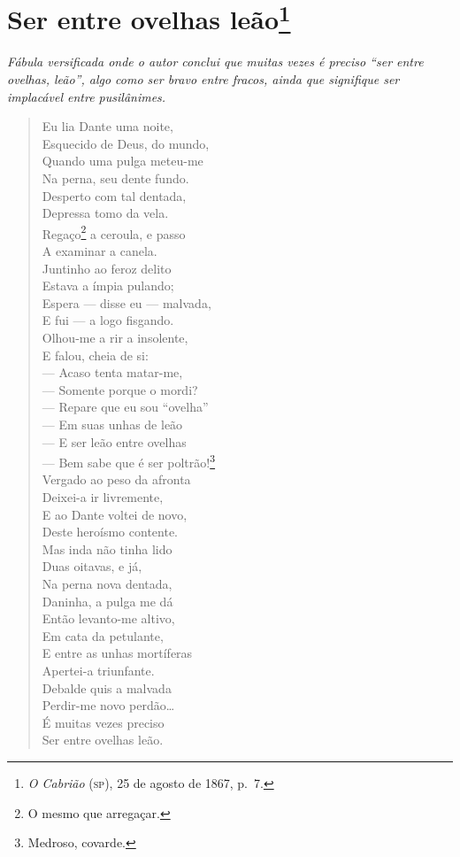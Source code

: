\chapter{Ser entre ovelhas leão\footnote{
\emph{O Cabrião} (\textsc{sp}), 25 de agosto de 1867, p.~7.}}

\begin{didascalia}
\emph{Fábula versificada onde o autor conclui que muitas vezes é preciso
``ser entre ovelhas, leão'', algo como ser bravo entre fracos, ainda que
signifique ser implacável entre pusilânimes.}
\end{didascalia}


\begin{verse}
Eu lia Dante uma noite,\\
Esquecido de Deus, do mundo,\\
Quando uma pulga meteu-me\\
Na perna, seu dente fundo.\\
Desperto com tal dentada,\\
Depressa tomo da vela.\\
Regaço\footnote{ O mesmo que arregaçar.} a ceroula, e passo\\
A examinar a canela.\\
Juntinho ao feroz delito\\
Estava a ímpia pulando;\\
Espera --- disse eu --- malvada,\\
E fui --- a logo fisgando.\\
Olhou-me a rir a insolente,\\
E falou, cheia de si:\\
--- Acaso tenta matar-me,\\
--- Somente porque o mordi?\\
--- Repare que eu sou ``ovelha''\\
--- Em suas unhas de leão\\
--- E ser leão entre ovelhas\\
--- Bem sabe que é ser poltrão!\footnote{ Medroso, covarde.}\\
Vergado ao peso da afronta\\
Deixei-a ir livremente,\\
E ao Dante voltei de novo,\\
Deste heroísmo contente.\\
Mas inda não tinha lido\\
Duas oitavas, e já,\\
Na perna nova dentada,\\
Daninha, a pulga me dá\\
Então levanto-me altivo,\\
Em cata da petulante,\\
E entre as unhas mortíferas\\
Apertei-a triunfante.\\
Debalde quis a malvada\\
Perdir-me novo perdão\ldots{}\\ %
É muitas vezes preciso\\
Ser entre ovelhas leão.
\end{verse}

